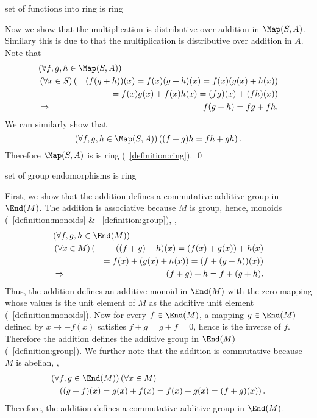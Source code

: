 \documentclass[17pt,landscape]{foils}
\begin{document}
{{{\begin{myproof}{set of functions into ring is ring}
\item
	Now we show that the multiplication is distributive over addition in $\Map(S,A)$.
	Similary this is due to that the multiplication is distributive over addition in $A$.
	Note that
	\begin{eqnarray*}
		\lefteqn{
		\left(
			\forall f,g,h \in \Map(S,A)
		\right)
		}
		\\
		&
		\left(
			\forall x \in S
		\right)
		(&
			(f (g+h))(x)
			= f(x)(g+h)(x)
			= f(x)(g(x) + h(x))
		\\&&
			= f(x) g(x) + f(x) h(x)
			= (fg)(x) + (fh)(x)
		)
		\\
		& \Rightarrow&
		f (g+h) = fg + fh.
	\end{eqnarray*}
	We can similarly show that
	$$
		\left(
			\forall f,g,h \in \Map(S,A)
		\right)
		\left(
		(f+g) h = f h + g h
		\right).
	$$
\eit
	Therefore
	$\Map(S,A)$
	is
	is ring
	(~\ref{definition:ring}).
	\qed\
\end{myproof}

\begin{myproof}{set of group endomorphisms is ring}
\bit
\item
	First, we show that the addition defines a commutative additive group in $\End(M)$.
	The addition is associative because $M$ is group, hence, monoids
	(~\ref{definition:monoids} \& \definitionname~\ref{definition:group}),
	\ie,
	\begin{eqnarray*}
		\lefteqn{
		\left(
			\forall f,g,h \in \End(M)
		\right)
		}
		\\
		&
		\left(
			\forall x \in M
		\right)
		(&
			((f+g)+h)(x)
			= (f(x)+g(x)) + h(x)
		\\
		&&
			= f(x)+ (g(x) + h(x))
			= (f+ (g + h))(x)
		)
		\\
		&\Rightarrow&
		(f+g)+h = f+(g+h).
	\end{eqnarray*}
	Thus, the addition defines an additive monoid in $\End(M)$
	with the zero mapping whose values is the unit element of $M$
	as the additive unit element
	(~\ref{definition:monoids}).
	Now for every $f\in \End(M)$,
	a mapping $g\in\End(M)$ defined by $x \mapsto -f(x)$
	satisfies $f+g = g+f=0$,
	hence is the inverse of $f$.
	Therefore the addition defines the additive group in $\End(M)$ (~\ref{definition:group}).
	We further note that
	the addition is commutative because $M$ is abelian,
	\ie,
	\begin{eqnarray*}
		\lefteqn{
		\left(
			\forall f,g \in \End(M)
		\right)
		\left(
			\forall x \in M
		\right)
		}
		\\
		&&
		\left(
			(g+f)(x) = g(x) + f(x) = f(x) + g(x) = (f+g)(x)
		\right).
	\end{eqnarray*}
	Therefore, the addition defines a commutative additive group in $\End(M)$.


\end{myproof}}}}
\end{document}
